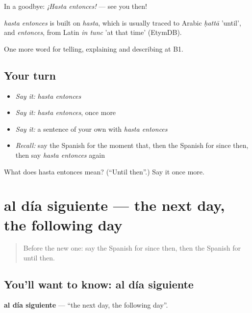 In a goodbye: \emph{¡Hasta entonces!} — see you then!

\begin{cousinweb}
\emph{hasta entonces} is built on \emph{hasta}, which is usually traced to Arabic \emph{ḥattā} 'until', and \emph{entonces}, from Latin \emph{in tunc} 'at that time' (EtymDB).
\end{cousinweb}

\begin{grammarlens}[title={What you've built}]
One more word for telling, explaining and describing at B1.
\end{grammarlens}

\subsection*{Your turn}
\begin{itemize}
\raggedright
  \item \emph{Say it:} \emph{hasta entonces}
  \item \emph{Say it:} \emph{hasta entonces}, once more
  \item \emph{Say it:} a sentence of your own with \emph{hasta entonces}
  \item \emph{Recall:} say the Spanish for the moment that, then the Spanish for since then, then say \emph{hasta entonces} again
\end{itemize}

\begin{tcolorbox}[breakable,colback=teal!4,colframe=teal!35!black,title={Before you move on}]
What does hasta entonces mean? (\textquotedblleft{}Until then\textquotedblright{}.) Say it once more.
\end{tcolorbox}
\section[al día siguiente]{al día siguiente — the next day, the following day}

\label{lesson:ES-C537-al-dia-siguiente}



\begin{quote}
Before the new one: say the Spanish for since then, then the Spanish for until then.
\end{quote}

\subsection*{You'll want to know: al día siguiente}
\textbf{al día siguiente} — \textquotedblleft{}the next day, the following day\textquotedblright{}.

